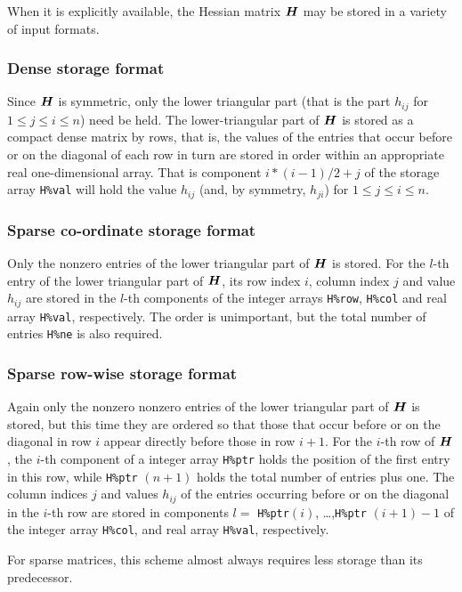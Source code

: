 \documentclass{galahad}
\begin{document}
\galmatrix
When it is explicitly available,  
the Hessian matrix ${\bm{H}}$ may be stored in a variety of input formats.

\subsubsection{Dense storage format}\label{dense}
Since ${\bm{H}}$ is symmetric, only the lower triangular part (that is the part 
$h_{ij}$ for $1 \leq j \leq i \leq n$) need be held. 
The lower-triangular part of ${\bm{H}}$ is stored as a compact 
dense matrix by rows, that is, the values of the entries that occur before
or on the diagonal of each row in turn are
stored in order within an appropriate real one-dimensional array.
That is component $i \ast (i-1)/2 + j$ of the storage array {\tt H\%val}  
will hold the value $h_{ij}$ (and, by symmetry, $h_{ji}$)
for $1 \leq j \leq i \leq n$.

\subsubsection{Sparse co-ordinate storage format}\label{coordinate}
Only the nonzero entries of the lower triangular part of ${\bm{H}}$ is stored. 
For the $l$-th entry of the lower triangular part of ${\bm{H}}$, 
its row index $i$, column index $j$ and value $h_{ij}$
are stored in the $l$-th components of the integer arrays {\tt H\%row}, 
{\tt H\%col} and real array {\tt H\%val}, respectively.
The order is unimportant, but the total
number of entries {\tt H\%ne} is also required. 

\subsubsection{Sparse row-wise storage format}\label{rowwise}
Again only the nonzero nonzero entries of the lower triangular 
part of ${\bm{H}}$ is stored, but this time they are ordered so that those 
that occur before or on the diagonal in row $i$ appear directly before those
in row $i+1$. For the $i$-th row of ${\bm{H}}$, the $i$-th component of a 
integer array {\tt H\%ptr} holds the position of the first entry in this row,
while {\tt H\%ptr} $(n+1)$ holds the total number of entries plus one.
The column indices $j$ and values $h_{ij}$ of the entries 
occurring before or on the diagonal in the $i$-th row are stored in components 
$l =$ {\tt H\%ptr}$(i)$, \ldots ,{\tt H\%ptr} $(i+1)-1$ of the 
integer array {\tt H\%col}, and real array {\tt H\%val}, respectively. 

For sparse matrices, this scheme almost always requires less storage than 
its predecessor.
\end{document}
